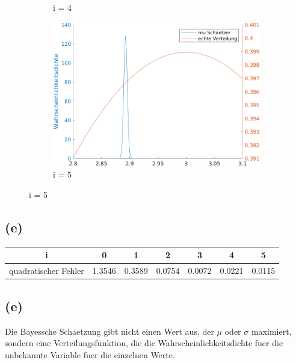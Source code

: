 \documentclass[a4paper]{scrartcl}
\begin{document}
\begin{figure}[H]
\begin{subfigure}{.5\textwidth}
		\caption*{i = 4}
	\end{subfigure}%
	\begin{subfigure}{.5\textwidth}
		\centering
		\includegraphics*[scale = 0.4]{assignment3_data/plots/q3_i5}
		\caption*{i = 5}
	\end{subfigure}
\end{figure}

\subsection*{(e)}
\begin{tabular}{|c|c|c|c|c|c|c|}
	\hline 
	i & 0 & 1 & 2 & 3 & 4 & 5 \\ 
	\hline 
	quadratischer Fehler & 1.3546 & 0.3589 & 0.0754 & 0.0072 & 0.0221 & 0.0115 \\ 
	\hline 
\end{tabular}

\subsection*{(e)}
Die Bayessche Schaetzung gibt nicht einen Wert aus, der $\mu$ oder $\sigma$ maximiert, sondern eine Verteilungsfunktion, die die Wahrscheinlichkeitsdichte fuer die unbekannte Variable fuer die einzelnen Werte. 
\end{document}
